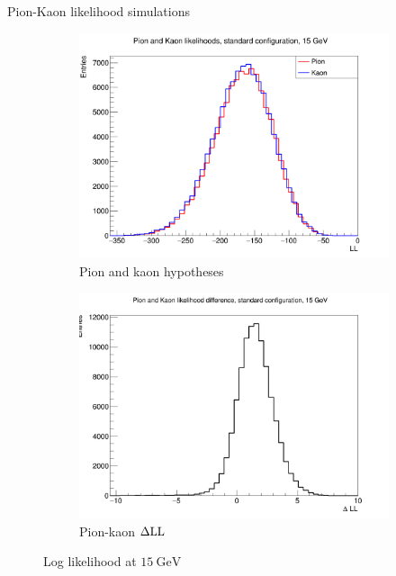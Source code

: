 \documentclass{beamer}
\begin{document}
\begin{frame}{Pion-Kaon likelihood simulations}
  \begin{figure}
    \centering
    \vspace{-0.2cm}
    \begin{subfigure}{0.5\textwidth}
      \includegraphics[width = 1.0\textwidth]{Plots/PionKaonLL15GeVStandard.png}
      \caption{Pion and kaon hypotheses}
    \end{subfigure}%
    \begin{subfigure}{0.5\textwidth}
      \includegraphics[width = 1.0\textwidth]{Plots/PionKaonDLL15GeVStandard.png}
      \caption{Pion-kaon $\Delta{\rm LL}$}
    \end{subfigure}
    \caption{Log likelihood at $\SI{15}{\giga\eV}$}
  \end{figure}
\end{frame}
\end{document}
